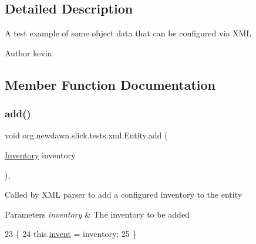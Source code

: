 \subsection{Detailed Description}
A test example of some object data that can be configured via X\+ML

\begin{DoxyAuthor}{Author}
kevin 
\end{DoxyAuthor}


\subsection{Member Function Documentation}
\mbox{\label{classorg_1_1newdawn_1_1slick_1_1tests_1_1xml_1_1_entity_aed34145378df65de2af166d8a30e1cd9}} 
\subsubsection{\texorpdfstring{add()}{add()}\hspace{0.1cm}{\footnotesize\ttfamily [1/2]}}
{\footnotesize\ttfamily void org.\+newdawn.\+slick.\+tests.\+xml.\+Entity.\+add (\begin{DoxyParamCaption}\item[{\mbox{\hyperlink{classorg_1_1newdawn_1_1slick_1_1tests_1_1xml_1_1_inventory}{Inventory}}}]{inventory }\end{DoxyParamCaption})\hspace{0.3cm}{\ttfamily [inline]}, {\ttfamily [private]}}

Called by X\+ML parser to add a configured inventory to the entity


\begin{DoxyParams}{Parameters}
{\em inventory} & The inventory to be added \\
\hline
\end{DoxyParams}

\begin{DoxyCode}
23                                           \{
24         this.\mbox{\hyperlink{classorg_1_1newdawn_1_1slick_1_1tests_1_1xml_1_1_entity_acd01fa984ba073425ec57b2c071c397f}{invent}} = inventory;
25     \}
\end{DoxyCode}
\mbox{\label{classorg_1_1newdawn_1_1slick_1_1tests_1_1xml_1_1_entity_aab6a1cb7b53b0bd0ef1df57f03407751}} 
